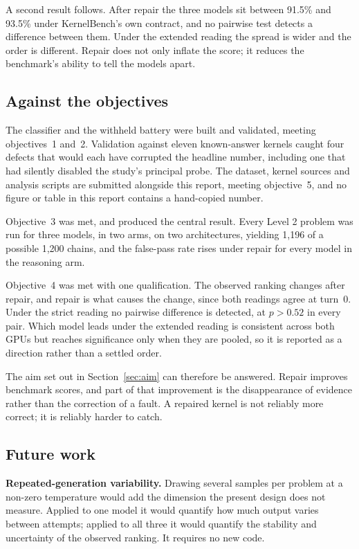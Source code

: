 \documentclass[12pt]{article}
\begin{document}
A second result follows. After repair the three models sit between 91.5\% and
93.5\% under KernelBench's own contract, and no pairwise test detects a
difference between them. Under the extended reading the spread is wider and the
order is different. Repair does not only inflate the score;
it reduces the benchmark's ability to tell the models apart.

\subsection{Against the objectives}

The classifier and the withheld battery were built and validated, meeting
objectives~1 and~2. Validation against eleven known-answer kernels caught four
defects that would each have corrupted the headline number, including one that
had silently disabled the study's principal probe. The dataset, kernel sources
and analysis scripts are submitted alongside this report, meeting objective~5,
and no figure or table in this report contains a hand-copied number.

Objective~3 was met, and produced the central result. Every Level 2 problem was
run for three models, in two arms, on two architectures, yielding 1{,}196 of a
possible 1{,}200 chains, and the false-pass rate rises under repair for every
model in the reasoning arm.

Objective~4 was met with one qualification. The observed ranking changes after
repair, and repair is what causes the change, since both readings agree at
turn~0. Under the strict reading no
pairwise difference is detected, at $p > 0.52$ in every pair. Which model leads under the extended reading is
consistent across both GPUs but reaches significance only when they are pooled,
so it is reported as a direction rather than a settled order.

The aim set out in Section~\ref{sec:aim} can therefore be answered. Repair
improves benchmark scores, and part of that improvement is the disappearance of
evidence rather than the correction of a fault. A repaired kernel is not
reliably more correct; it is reliably harder to catch.

\subsection{Future work}

\textbf{Repeated-generation variability.} Drawing several samples per problem at
a non-zero temperature would add the dimension the present design does not
measure. Applied to one model it would quantify how much output varies between
attempts; applied to all three it would quantify the stability and uncertainty
of the observed ranking. It requires no new code.
\end{document}
